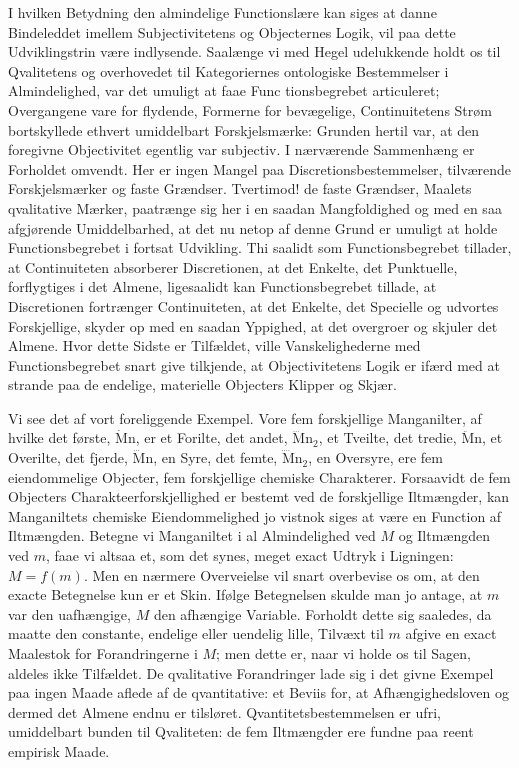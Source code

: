 \documentclass[12pt]{book}
\newcommand{\opage}[1]{\marginnote{\footnotesize\textit{[#1]}}}
\newcommand{\apage}[1]{\marginnote{\footnotesize\textit{[#1]}}}
\begin{document}
I hvilken Betydning den almindelige Functionslære kan siges at danne Bindeleddet
imellem Subjectivitetens og Objecternes Logik, vil paa dette Udviklingstrin være
indlysende. Saalænge vi med Hegel udelukkende holdt os til Qvalitetens og overhovedet
til Kategoriernes ontologiske Bestemmelser i Almindelighed, var det umuligt at faae
Func\-%
 \apage{324}tionsbegrebet articuleret; Overgangene vare for flydende, Formerne for bevægelige,
Continuitetens Strøm bortskyllede ethvert umiddelbart Forskjelsmærke: Grunden hertil
var, at den foregivne Objectivitet egentlig var subjectiv. I nærværende Sammenhæng er
Forholdet omvendt. Her er ingen Mangel paa Discretionsbestemmelser, tilværende
Forskjelsmærker og faste Grændser. Tvertimod! de faste Grændser, Maalets qvalitative
Mærker, paatrænge sig her i en saadan Mangfoldighed og med en saa afgjørende
Umiddelbarhed, at det nu netop af denne Grund er umuligt at holde Functionsbegrebet i
fortsat Udvikling. Thi saalidt som Functionsbegrebet tillader, at Continuiteten
absorberer Discretionen, at det Enkelte, det Punktuelle, forflygtiges i det Almene,
ligesaalidt kan Functionsbegrebet tillade, at Discretionen fortrænger Continuiteten,
at det Enkelte, det Specielle og udvortes Forskjellige, skyder op med en saadan
Yppighed, at det overgroer og skjuler det Almene. Hvor dette Sidste er Tilfældet,
ville Vanskelighederne med Functionsbegrebet snart give tilkjende, at Objectivitetens
Logik er ifærd med at strande paa de endelige, materielle Objecters Klipper og Skjær.

Vi see det af vort foreliggende Exempel. Vore fem forskjellige Manganilter, af hvilke
det første, $\dot{\mathrm{M}}\mathrm{n}$, er et Forilte, det andet,
$\dddot{\mathrm{M}}\mathrm{n}_{2}$, et Tveilte, det tredie, $\ddot{\mathrm{M}}\mathrm{n}$,
et Overilte, det fjerde, $\dddot{\mathrm{M}}\mathrm{n}$, en Syre, det femte,
$\ddddot{\mathrm{M}}\mathrm{n}_{2}$, en Oversyre, ere fem eiendommelige Objecter, fem
forskjellige chemiske Charakterer. Forsaavidt de fem Objecters
Charakteerforskjellighed er bestemt ved de forskjellige Iltmængder, kan Manganiltets
chemiske Eiendommelighed jo vistnok siges at være en Function af Iltmængden. Betegne
vi Manganiltet i al Almindelighed ved $M$ og Iltmængden ved $m$, faae vi altsaa et,
som det synes, meget exact Udtryk i Ligningen: $M = f(m)$. Men en nærmere Overveielse
vil snart overbevise os om, at den exacte
\opage{325} Betegnelse kun er et Skin. Ifølge Betegnelsen skulde man jo antage, at $m$ var den
uafhængige, $M$ den afhængige Variable. Forholdt dette sig saaledes, da maatte den
constante, endelige eller uendelig lille, Tilvæxt til $m$ afgive en exact Maalestok
for Forandringerne i $M$; men dette er, naar vi holde os til Sagen, aldeles ikke
Tilfældet. De qvalitative Forandringer lade sig i det givne Exempel paa ingen Maade
aflede af de qvantitative: et Beviis for, at Afhængighedsloven og dermed det Almene
endnu er tilsløret. Qvantitetsbestemmelsen er ufri, umiddelbart bunden til Qvaliteten:
de fem Iltmængder ere fundne paa reent empirisk Maade.
\end{document}
